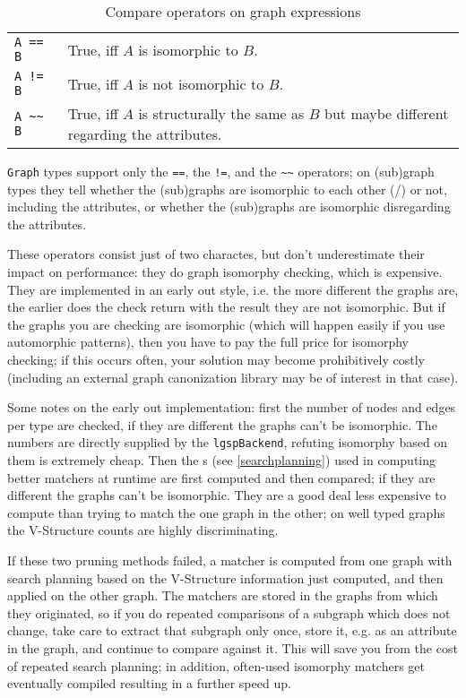 \begin{table}[htbp]
  \centering
  \begin{tabularx}{\linewidth}{|l|X|} \hline
    \texttt{A == B} & True, iff $A$ is isomorphic to $B$. \\
    \texttt{A != B} & True, iff $A$ is not isomorphic to $B$. \\
    \texttt{A \textasciitilde\textasciitilde{ } B} & True, iff $A$ is structurally the same as $B$ but maybe different regarding the attributes. \\ \hline
  \end{tabularx}
  \caption{Compare operators on graph expressions}
  \label{compandgraph}
\end{table}

\texttt{Graph} types support only the \texttt{==}, the \texttt{!=}, and the \texttt{\textasciitilde\textasciitilde} operators;
on (sub)graph types they tell whether the (sub)graphs are isomorphic to each other (/) or not, including the attributes, or whether the (sub)graphs are isomorphic disregarding the attributes.

These operators consist just of two charactes, but don't underestimate their impact on performance:
they do graph isomorphy checking, which is expensive.
They are implemented in an early out style, i.e. the more different the graphs are, the earlier does the check return with the result they are not isomorphic.
But if the graphs you are checking are isomorphic (which will happen easily if you use automorphic patterns), then you have to pay the full price for isomorphy checking; if this occurs often, your solution may become prohibitively costly (including an external graph canonization library may be of interest in that case).

Some notes on the early out implementation: first the number of nodes and edges per type are checked, if they are different the graphs can't be isomorphic. The numbers are directly supplied by the \texttt{lgspBackend}, refuting isomorphy based on them is extremely cheap.
Then the s (see \ref{searchplanning}) used in computing better matchers at runtime are first computed and then compared; if they are different the graphs can't be isomorphic. They are a good deal less expensive to compute than trying to match the one graph in the other; on well typed graphs the V-Structure counts are highly discriminating.

If these two pruning methods failed, a matcher is computed from one graph with search planning based on the V-Structure information just computed, and then applied on the other graph.
The matchers are stored in the graphs from which they originated, so if you do repeated comparisons of a subgraph which does not change, take care to extract that subgraph only once, store it, e.g. as an attribute in the graph, and continue to compare against it. 
This will save you from the cost of repeated search planning; in addition, often-used isomorphy matchers get eventually compiled resulting in a further speed up.


